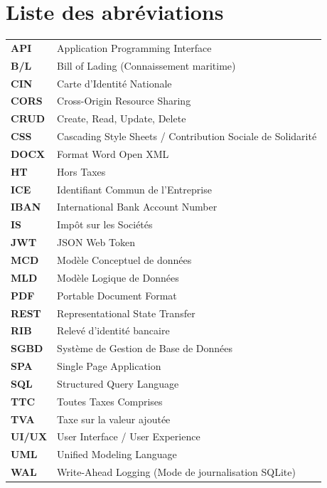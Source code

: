 \documentclass[12pt,a4paper,oneside]{report}
\begin{document}
\chapter*{Liste des abréviations}
\begin{longtable}{p{3cm}p{11cm}}
\textbf{API} & Application Programming Interface\\
\textbf{B/L} & Bill of Lading (Connaissement maritime)\\
\textbf{CIN} & Carte d'Identité Nationale\\
\textbf{CORS} & Cross-Origin Resource Sharing\\
\textbf{CRUD} & Create, Read, Update, Delete\\
\textbf{CSS} & Cascading Style Sheets / Contribution Sociale de Solidarité\\
\textbf{DOCX} & Format Word Open XML\\
\textbf{HT} & Hors Taxes\\
\textbf{ICE} & Identifiant Commun de l'Entreprise\\
\textbf{IBAN} & International Bank Account Number\\
\textbf{IS} & Impôt sur les Sociétés\\
\textbf{JWT} & JSON Web Token\\
\textbf{MCD} & Modèle Conceptuel de données\\
\textbf{MLD} & Modèle Logique de Données\\
\textbf{PDF} & Portable Document Format\\
\textbf{REST} & Representational State Transfer\\
\textbf{RIB} & Relevé d'identité bancaire\\
\textbf{SGBD} & Système de Gestion de Base de Données\\
\textbf{SPA} & Single Page Application\\
\textbf{SQL} & Structured Query Language\\
\textbf{TTC} & Toutes Taxes Comprises\\
\textbf{TVA} & Taxe sur la valeur ajoutée\\
\textbf{UI/UX} & User Interface / User Experience\\
\textbf{UML} & Unified Modeling Language\\
\textbf{WAL} & Write-Ahead Logging (Mode de journalisation SQLite)\\
\end{longtable}

\tableofcontents
\listoffigures
\listoftables
\clearpage
{}
\end{document}
